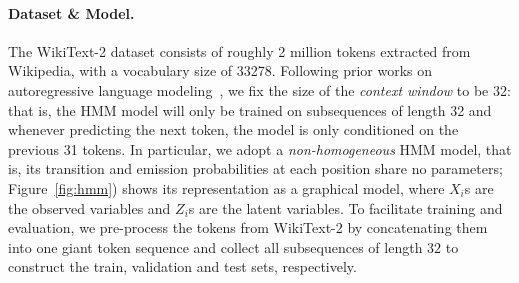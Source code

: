 \documentclass{article} %
\begin{document}
\paragraph{Dataset \& Model.} The WikiText-2 dataset consists of roughly 2 million tokens extracted from Wikipedia, with a vocabulary size of 33278. Following prior works on autoregressive language modeling~\citep{radford2019language}, we fix the size of the \emph{context window} to be 32: that is, the HMM model will only be trained on subsequences of length 32 and whenever predicting the next token, the model is only conditioned on the previous 31 tokens. In particular, we adopt a \emph{non-homogeneous} HMM model, that is, its transition and emission probabilities at each position share no parameters; Figure~\ref{fig:hmm}) shows its representation as a graphical model, where $X_i$s are the observed variables and $Z_i$s are the latent variables.
To facilitate training and evaluation, we pre-process the tokens from WikiText-2 by concatenating them into one giant token sequence and collect all subsequences of length $32$ to construct the train, validation and test sets, respectively.
\end{document}
